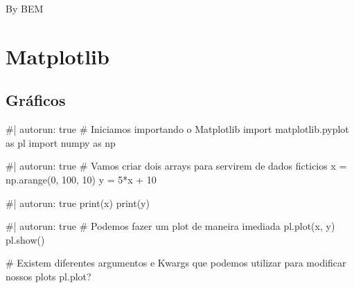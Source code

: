 \documentclass[
  letterpaper,
  DIV=11,
  numbers=noendperiod]{scrreprt}
\newenvironment{Shaded}{\begin{snugshade}}{\end{snugshade}}
\newcommand{\CommentTok}[1]{\textcolor[rgb]{0.37,0.37,0.37}{#1}}
\newcommand{\NormalTok}[1]{\textcolor[rgb]{0.00,0.23,0.31}{#1}}
\begin{document}
By BEM

\chapter{Matplotlib}\label{matplotlib}

\section{Gráficos}\label{gruxe1ficos}

\begin{Shaded}
\begin{Highlighting}[]
\NormalTok{\#| autorun: true}
\NormalTok{\# Iniciamos importando o Matplotlib}
\NormalTok{import matplotlib.pyplot as pl}
\NormalTok{import numpy as np}
\end{Highlighting}
\end{Shaded}

\begin{Shaded}
\begin{Highlighting}[]
\NormalTok{\#| autorun: true}
\NormalTok{\# Vamos criar dois arrays para servirem de dados ficticios}
\NormalTok{x = np.arange(0, 100, 10)}
\NormalTok{y = 5*x + 10}
\end{Highlighting}
\end{Shaded}

\begin{Shaded}
\begin{Highlighting}[]
\NormalTok{\#| autorun: true}
\NormalTok{print(x)}
\NormalTok{print(y)}
\end{Highlighting}
\end{Shaded}

\begin{Shaded}
\begin{Highlighting}[]
\NormalTok{\#| autorun: true}
\NormalTok{\# Podemos fazer um plot de maneira imediada}
\NormalTok{pl.plot(x, y)}
\NormalTok{pl.show()}
\end{Highlighting}
\end{Shaded}

\begin{Shaded}
\begin{Highlighting}[]
\CommentTok{\# Existem diferentes argumentos e Kwargs que podemos utilizar para modificar nossos plots}
\NormalTok{pl.plot?}
\end{Highlighting}
\end{Shaded}
\end{document}
